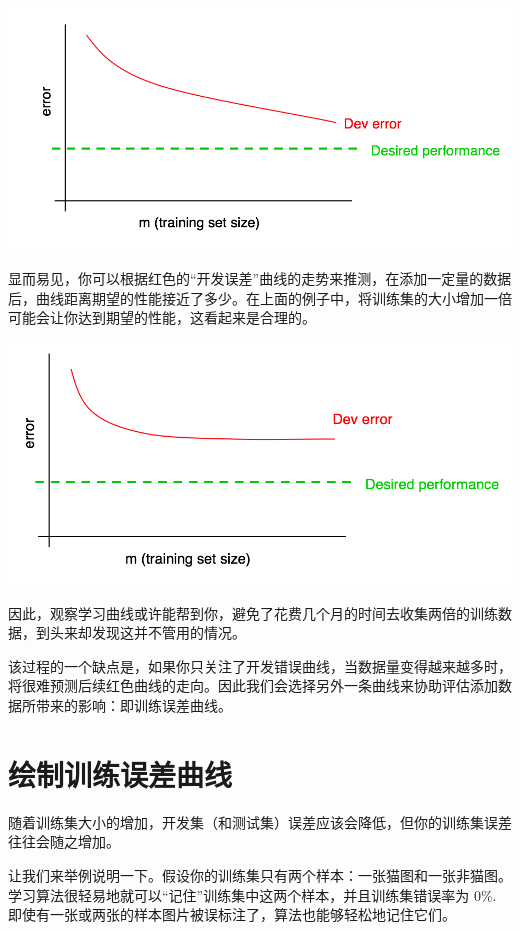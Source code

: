 \includegraphics{./img/ch28_02.jpg}

显而易见，你可以根据红色的``开发误差''曲线的走势来推测，在添加一定量的数据后，曲线距离期望的性能接近了多少。在上面的例子中，将训练集的大小增加一倍可能会让你达到期望的性能，这看起来是合理的。

\includegraphics{./img/ch28_03.jpg}

因此，观察学习曲线或许能帮到你，避免了花费几个月的时间去收集两倍的训练数据，到头来却发现这并不管用的情况。

该过程的一个缺点是，如果你只关注了开发错误曲线，当数据量变得越来越多时，将很难预测后续红色曲线的走向。因此我们会选择另外一条曲线来协助评估添加数据所带来的影响：即训练误差曲线。

\hypertarget{ux7ed8ux5236ux8badux7ec3ux8befux5deeux66f2ux7ebf}{%
\chapter{绘制训练误差曲线}\label{ux7ed8ux5236ux8badux7ec3ux8befux5deeux66f2ux7ebf}}

随着训练集大小的增加，开发集（和测试集）误差应该会降低，但你的训练集误差往往会随之增加。

让我们来举例说明一下。假设你的训练集只有两个样本：一张猫图和一张非猫图。学习算法很轻易地就可以``记住''训练集中这两个样本，并且训练集错误率为
0\%. 即使有一张或两张的样本图片被误标注了，算法也能够轻松地记住它们。

